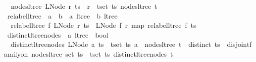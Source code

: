 \begin{isabellebody}
\ \ {\isachardoublequoteopen}nodes{\isacharunderscore}{\kern0pt}ltree\ {\isacharparenleft}{\kern0pt}LNode\ r\ ts{\isacharparenright}{\kern0pt}\ {\isacharequal}{\kern0pt}\ {\isacharbraceleft}{\kern0pt}r{\isacharbraceright}{\kern0pt}\ {\isasymunion}\ {\isacharparenleft}{\kern0pt}{\isasymUnion}t{\isasymin}set\ ts{\isachardot}{\kern0pt}\ nodes{\isacharunderscore}{\kern0pt}ltree\ t{\isacharparenright}{\kern0pt}{\isachardoublequoteclose}\isanewline
\isanewline
{}\isamarkupfalse%
\ relabel{\isacharunderscore}{\kern0pt}ltree\ {\isacharcolon}{\kern0pt}{\isacharcolon}{\kern0pt}\ {\isachardoublequoteopen}{\isacharparenleft}{\kern0pt}{\isacharprime}{\kern0pt}a\ {\isasymRightarrow}\ {\isacharprime}{\kern0pt}b{\isacharparenright}{\kern0pt}\ {\isasymRightarrow}\ {\isacharprime}{\kern0pt}a\ ltree\ {\isasymRightarrow}\ {\isacharprime}{\kern0pt}b\ ltree{\isachardoublequoteclose}\ \isanewline
\ \ {\isachardoublequoteopen}relabel{\isacharunderscore}{\kern0pt}ltree\ f\ {\isacharparenleft}{\kern0pt}LNode\ r\ ts{\isacharparenright}{\kern0pt}\ {\isacharequal}{\kern0pt}\ LNode\ {\isacharparenleft}{\kern0pt}f\ r{\isacharparenright}{\kern0pt}\ {\isacharparenleft}{\kern0pt}map\ {\isacharparenleft}{\kern0pt}relabel{\isacharunderscore}{\kern0pt}ltree\ f{\isacharparenright}{\kern0pt}\ ts{\isacharparenright}{\kern0pt}{\isachardoublequoteclose}\isanewline
\isanewline
{}\isamarkupfalse%
\ distinct{\isacharunderscore}{\kern0pt}ltree{\isacharunderscore}{\kern0pt}nodes\ {\isacharcolon}{\kern0pt}{\isacharcolon}{\kern0pt}\ {\isachardoublequoteopen}{\isacharprime}{\kern0pt}a\ ltree\ {\isasymRightarrow}\ bool{\isachardoublequoteclose}\ \isanewline
\ \ {\isachardoublequoteopen}distinct{\isacharunderscore}{\kern0pt}ltree{\isacharunderscore}{\kern0pt}nodes\ {\isacharparenleft}{\kern0pt}LNode\ a\ ts{\isacharparenright}{\kern0pt}\ {\isasymlongleftrightarrow}\ {\isacharparenleft}{\kern0pt}{\isasymforall}t{\isasymin}set\ ts{\isachardot}{\kern0pt}\ a\ {\isasymnotin}\ nodes{\isacharunderscore}{\kern0pt}ltree\ t{\isacharparenright}{\kern0pt}\ {\isasymand}\ distinct\ ts\ {\isasymand}\ disjoint{\isacharunderscore}{\kern0pt}family{\isacharunderscore}{\kern0pt}on\ nodes{\isacharunderscore}{\kern0pt}ltree\ {\isacharparenleft}{\kern0pt}set\ ts{\isacharparenright}{\kern0pt}\ {\isasymand}\ {\isacharparenleft}{\kern0pt}{\isasymforall}t{\isasymin}set\ ts{\isachardot}{\kern0pt}\ distinct{\isacharunderscore}{\kern0pt}ltree{\isacharunderscore}{\kern0pt}nodes\ t{\isacharparenright}{\kern0pt}{\isachardoublequoteclose}\isanewline
\isanewline
{}\isamarkupfalse%

\end{isabellebody}
